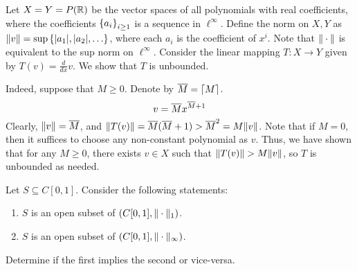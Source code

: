 \documentclass{article}
\begin{document}
\begin{soln}
    Let $ X = Y = P(\mathbb{R}) $ be the vector spaces of all polynomials with real coefficients,
    where the coefficients $ \left\{{a_{i}}\right\}_{i\geq1} $ is a sequence in $ \ell^{ \infty} $.
    Define the norm on $ X, Y $ as $ \|v\| = \sup \left\{{\abs{a_{1}}, \abs{a_{2}}, \dots}\right\} $,
    where each $ a_{i} $ is the coefficient of $ x^{i} $.
    Note that  $ \|\cdot\| $ is equivalent to the sup norm on $ \ell^{ \infty} $. \vsp
    Consider the linear mapping $ T: X \rightarrow Y $ given by $ T(v) = \frac{d}{dx} v $.
    We show that $ T $ is unbounded. \npgh
    
    Indeed, suppose that $ M \geq 0 $.
    Denote by $ \overline{M} = \lceil M \rceil $.
    \begin{equation*}
        v = \overline{M}x^{\overline{M} + 1}
    \end{equation*}
    Clearly, $ \|v\| = \overline{M} $, and
    $ \|T(v)\| = \overline{M}(\overline{M} + 1) > \overline{M}^{2}= M \|v\| $.
    Note that if $ M = 0 $, then it suffices to choose any non-constant polynomial as $ v $. \vsp
    Thus, we have shown that for any $ M \geq 0 $,
    there exists $ v \in X $ such that $ \|T(v)\| > M \|v\| $,
    so $ T $ is unbounded as needed.
\end{soln}

\newpage
{}

\begin{qu}
    Let $ S \subseteq C[0, 1] $. Consider the following statements:
    \begin{enumerate}
        \item $ S $ is an open subset of $ (C[0, 1], \|\cdot\|_{1}) $.
        \item $ S $ is an open subset of $ (C[0, 1], \|\cdot\|_{\infty}) $.
    \end{enumerate}
    Determine if the first implies the second or vice-versa.
\end{qu}
\end{document}
